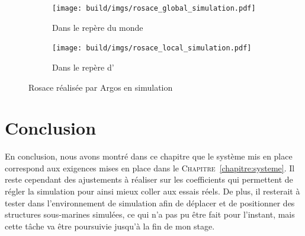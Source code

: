			\begin{figure}[!htb]
				\centering
				\begin{subfigure}[t]{0.48\textwidth}
					\centering
					\texttt{[image: build/imgs/rosace\_global\_simulation.pdf]}
					\caption{Dans le repère du monde}
				\end{subfigure}
				\hfill
				\begin{subfigure}[t]{0.48\textwidth}
					\centering
					\texttt{[image: build/imgs/rosace\_local\_simulation.pdf]}
					\caption{Dans le repère d'\argos{}}
				\end{subfigure}
				\caption{Rosace réalisée par Argos en simulation}
				\label{fig:rosace_argos_simulation}
			\end{figure}

	\section{Conclusion}

		En conclusion, nous avons montré dans ce chapitre que le système mis en place correspond aux exigences mises en place dans le \textsc{Chapitre}~\ref{chapitre:systeme}. Il reste cependant des ajustements à réaliser sur les coefficients qui permettent de régler la simulation pour ainsi mieux coller aux essais réels. De plus, il resterait à tester \atoll{} dans l'environnement de simulation afin de déplacer et de positionner des structures sous-marines simulées, ce qui n'a pas pu être fait pour l'instant, mais cette tâche va être poursuivie jusqu'à la fin de mon stage.